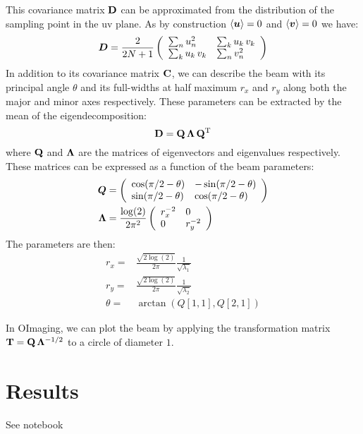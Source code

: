 \documentclass[a4paper,11pt,twoside]{scrartcl}
\begin{document}
This covariance matrix $\mathbf{D}$  can be approximated from the distribution of  the sampling point in the uv plane. As by construction $\left\langle \boldsymbol{u}\right\rangle = 0 $ and $\left\langle \boldsymbol{v}\right\rangle = 0$ we have:
\begin{equation}
	\boldsymbol{D} = \frac{2}{2N+1}\left(
		\begin{array}{ll}
			 \sum_n u_n^2 	 &  \sum_k u_k \,v_k\\
			 \sum_k u_k \,v_k &  \sum_n v_n^2
		\end{array}
	\right)
\end{equation}
In addition to its covariance matrix $\mathbf{C}$, we can describe the beam with its principal angle $\theta$ and its full-widths at half maximum  $r_x$  and  $r_y$ along both the major and minor axes respectively.   These parameters can be extracted by the mean of the eigendecomposition:
\begin{equation}
	\mathbf{D} = \mathbf{Q} \, \mathbf{\Lambda} \, \mathbf{Q}^{\mathrm{T}}
\end{equation}
where $\mathbf{Q}$ and $\mathbf{\Lambda}$ are the matrices of eigenvectors and eigenvalues respectively. These matrices can be expressed as a function of the beam parameters:
\begin{align}
	\boldsymbol{Q} &= \left(
		\begin{array}{ll}
			\cos(\pi/2 - \theta) & -\sin(\pi/2 - \theta) \\
			\sin(\pi/2 - \theta) & \cos(\pi/2 - \theta)  
		\end{array}
		\right)\\
	\boldsymbol{\Lambda} &=  \frac{\log(2)}{2\pi^2} \left(
		\begin{array}{ll}
		r_x^{-2}	&  0\\
		0 			&  r_y^{-2}
		\end{array}
		\right)\\
\end{align}
The parameters are then:
\begin{align}
	r_x = & \frac{\sqrt{2\log(2)}}{2\pi} \frac{1}{\sqrt{\lambda_1}}\\
	r_y = & \frac{\sqrt{2\log(2)}}{2\pi}  \frac{1}{\sqrt{\lambda_2}}\\
	\theta = & \arctan\left(Q[1,1], Q[2,1]\right)
\end{align}


In OImaging, we can plot the  beam by  applying  the transformation matrix $\mathbf{T} = \mathbf{Q}\,\mathbf{\Lambda}^{-1/2} $ to a circle of diameter $1$.


\section{Results}

See notebook
\end{document}

